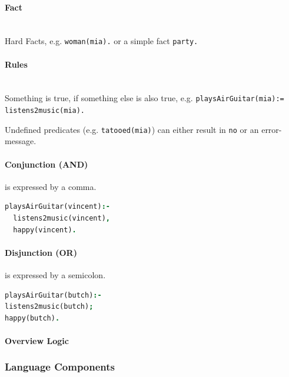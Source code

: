 \paragraph{Fact} \hfill \\
	Hard Facts, e.g. \lstinline|woman(mia).| or a simple fact \lstinline|party.|

\paragraph{Rules} \hfill \\
	Something is true, if something else is also true, e.g.  \lstinline|playsAirGuitar(mia):= listens2music(mia).|


Undefined predicates (e.g. \lstinline|tatooed(mia)|) can either result in \lstinline|no| or an error-message.

\paragraph{Conjunction (AND)}

is expressed by a comma.
\begin{lstlisting}[language=Prolog]
playsAirGuitar(vincent):-
  listens2music(vincent),
  happy(vincent).
\end{lstlisting}


\paragraph{Disjunction (OR)}

is expressed by a semicolon.
\begin{lstlisting}[language=Prolog]
playsAirGuitar(butch):-
listens2music(butch);
happy(butch).
\end{lstlisting}

\paragraph{Overview Logic}


\subsubsection{Language Components}

